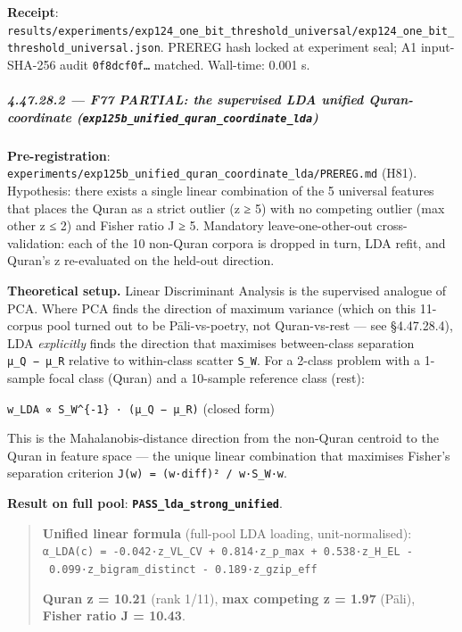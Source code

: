 \documentclass[
]{article}
\begin{document}
\textbf{Receipt}:
\texttt{results/experiments/exp124\_one\_bit\_threshold\_universal/exp124\_one\_bit\_threshold\_universal.json}.
PREREG hash locked at experiment seal; A1 input-SHA-256 audit
\texttt{0f8dcf0f…} matched. Wall-time: 0.001 s.

\subparagraph{\texorpdfstring{4.47.28.2 --- F77 PARTIAL: the supervised
LDA unified Quran-coordinate
(\texttt{exp125b\_unified\_quran\_coordinate\_lda})}{4.47.28.2 --- F77 PARTIAL: the supervised LDA unified Quran-coordinate (exp125b\_unified\_quran\_coordinate\_lda)}}\label{f77-partial-the-supervised-lda-unified-quran-coordinate-exp125b_unified_quran_coordinate_lda}

\textbf{Pre-registration}:
\texttt{experiments/exp125b\_unified\_quran\_coordinate\_lda/PREREG.md}
(H81). Hypothesis: there exists a single linear combination of the 5
universal features that places the Quran as a strict outlier
(\textbar z\textbar{} ≥ 5) with no competing outlier (max other
\textbar z\textbar{} ≤ 2) and Fisher ratio J ≥ 5. Mandatory
leave-one-other-out cross-validation: each of the 10 non-Quran corpora
is dropped in turn, LDA refit, and Quran's z re-evaluated on the
held-out direction.

\textbf{Theoretical setup.} Linear Discriminant Analysis is the
supervised analogue of PCA. Where PCA finds the direction of maximum
variance (which on this 11-corpus pool turned out to be Pāli-vs-poetry,
not Quran-vs-rest --- see §4.47.28.4), LDA \emph{explicitly} finds the
direction that maximises between-class separation \texttt{μ\_Q\ −\ μ\_R}
relative to within-class scatter \texttt{S\_W}. For a 2-class problem
with a 1-sample focal class (Quran) and a 10-sample reference class
(rest):

\texttt{w\_LDA\ ∝\ S\_W\^{}\{-1\}\ ·\ (μ\_Q\ −\ μ\_R)} (closed form)

This is the Mahalanobis-distance direction from the non-Quran centroid
to the Quran in feature space --- the unique linear combination that
maximises Fisher's separation criterion
\texttt{J(w)\ =\ (w·diff)²\ /\ w·S\_W·w}.

\textbf{Result on full pool}:
\textbf{\texttt{PASS\_lda\_strong\_unified}}.

\begin{quote}
\textbf{Unified linear formula} (full-pool LDA loading,
unit-normalised):
\texttt{α\_LDA(c)\ =\ -0.042·z\_VL\_CV\ +\ 0.814·z\_p\_max\ +\ 0.538·z\_H\_EL\ -\ 0.099·z\_bigram\_distinct\ -\ 0.189·z\_gzip\_eff}

\textbf{Quran \textbar z\textbar{} = 10.21} (rank 1/11), \textbf{max
competing \textbar z\textbar{} = 1.97} (Pāli), \textbf{Fisher ratio J =
10.43}.
\end{quote}
\end{document}
